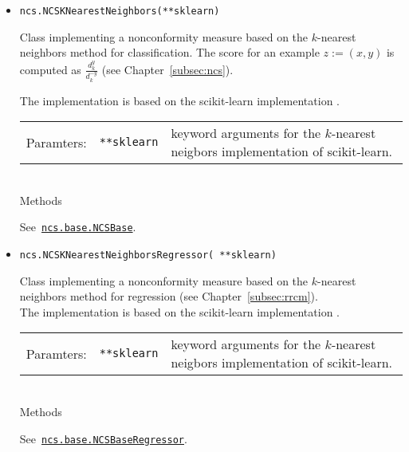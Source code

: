 \documentclass[twoside,11pt]{article}
\def\wo{~\\}
\begin{document}
\begin{appendices}
\begin{itemize}
        \item
          \texttt{ncs.NCSKNearestNeighbors(**sklearn)}

          Class implementing a nonconformity measure based
          on the $k$-nearest neighbors method for
          classification.
          The score for an example $z := (x,y)$ is computed
          as $\frac{d^{y}_k}{d^{-y}_k}$
          (see Chapter~\ref{subsec:ncs}).

          The implementation is based on the scikit-learn
          implementation \citep[see][]{sklearn_api}.
          \\

          \begin{tabu}{llX}
            Paramters: &\texttt{**sklearn}
                       &keyword arguments for the
                        $k$-nearest neigbors implementation
                        of scikit-learn.
          \end{tabu}
          \wo

          Methods

          See~\hyperref[itm:ncsbase]
          {\texttt{ncs.base.NCSBase}}.
          \\


        \item
          \texttt{ncs.NCSKNearestNeighborsRegressor(%
                  **sklearn)}

          Class implementing a nonconformity measure based
          on the $k$-nearest neighbors method for
          regression (see Chapter~\ref{subsec:rrcm}).
          \\

          The implementation is based on the scikit-learn
          implementation \citep[see][]{sklearn_api}.
          \\

          \begin{tabu}{llX}
            Paramters: &\texttt{**sklearn}
                       &keyword arguments for the
                        $k$-nearest neigbors implementation
                        of scikit-learn.
          \end{tabu}
          \wo

          Methods

          See~\hyperref[itm:ncsbaseregressor]
          {\texttt{ncs.base.NCSBaseRegressor}}.
          \\


\end{itemize}
\end{appendices}
\end{document}
